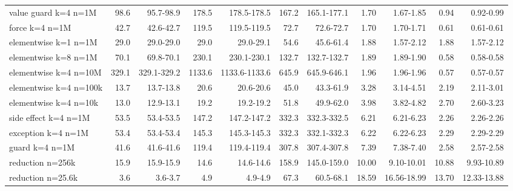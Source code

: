 \begin{tabular}{lrrrrrrrrrr}
value guard k=4 n=1M & 98.6 & 95.7-98.9 & 178.5 & 178.5-178.5 & 167.2 & 165.1-177.1 & 1.70 & 1.67-1.85 & 0.94 & 0.92-0.99 \\
force k=4 n=1M & 42.7 & 42.6-42.7 & 119.5 & 119.5-119.5 & 72.7 & 72.6-72.7 & 1.70 & 1.70-1.71 & 0.61 & 0.61-0.61 \\
elementwise k=1 n=1M & 29.0 & 29.0-29.0 & 29.0 & 29.0-29.1 & 54.6 & 45.6-61.4 & 1.88 & 1.57-2.12 & 1.88 & 1.57-2.12 \\
elementwise k=8 n=1M & 70.1 & 69.8-70.1 & 230.1 & 230.1-230.1 & 132.7 & 132.7-132.7 & 1.89 & 1.89-1.90 & 0.58 & 0.58-0.58 \\
elementwise k=4 n=10M & 329.1 & 329.1-329.2 & 1133.6 & 1133.6-1133.6 & 645.9 & 645.9-646.1 & 1.96 & 1.96-1.96 & 0.57 & 0.57-0.57 \\
elementwise k=4 n=100k & 13.7 & 13.7-13.8 & 20.6 & 20.6-20.6 & 45.0 & 43.3-61.9 & 3.28 & 3.14-4.51 & 2.19 & 2.11-3.01 \\
elementwise k=4 n=10k & 13.0 & 12.9-13.1 & 19.2 & 19.2-19.2 & 51.8 & 49.9-62.0 & 3.98 & 3.82-4.82 & 2.70 & 2.60-3.23 \\
side effect k=4 n=1M & 53.5 & 53.4-53.5 & 147.2 & 147.2-147.2 & 332.3 & 332.3-332.5 & 6.21 & 6.21-6.23 & 2.26 & 2.26-2.26 \\
exception k=4 n=1M & 53.4 & 53.4-53.4 & 145.3 & 145.3-145.3 & 332.3 & 332.1-332.3 & 6.22 & 6.22-6.23 & 2.29 & 2.29-2.29 \\
guard k=4 n=1M & 41.6 & 41.6-41.6 & 119.4 & 119.4-119.4 & 307.8 & 307.4-307.8 & 7.39 & 7.38-7.40 & 2.58 & 2.57-2.58 \\
reduction n=256k & 15.9 & 15.9-15.9 & 14.6 & 14.6-14.6 & 158.9 & 145.0-159.0 & 10.00 & 9.10-10.01 & 10.88 & 9.93-10.89 \\
reduction n=25.6k & 3.6 & 3.6-3.7 & 4.9 & 4.9-4.9 & 67.3 & 60.5-68.1 & 18.59 & 16.56-18.99 & 13.70 & 12.33-13.88 \\
\bottomrule
\end{tabular}
